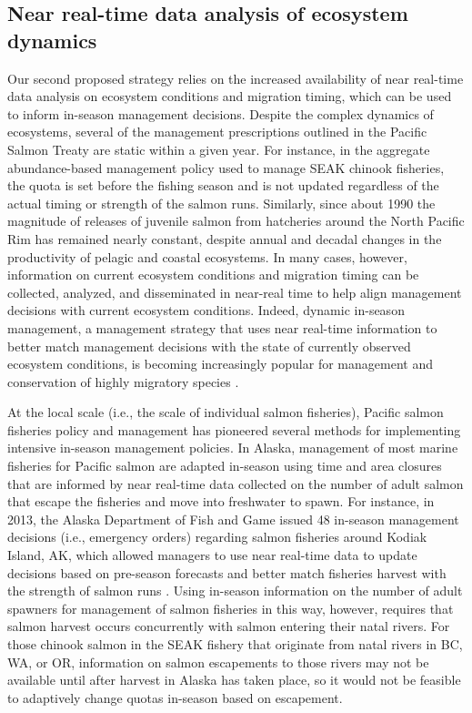 \subsection{Near real-time data analysis of ecosystem dynamics}

Our second proposed strategy relies on the increased availability of near
real-time data analysis on ecosystem conditions and migration timing, which can
be used to inform in-season management decisions. Despite the complex dynamics
of ecosystems, several of the management prescriptions outlined in the Pacific
Salmon Treaty are static within a given year. For instance, in the aggregate
abundance-based management policy used to manage SEAK chinook fisheries, the
quota is set before the fishing season and is not updated regardless of the
actual timing or strength of the salmon runs. Similarly, since about 1990 the
magnitude of releases of juvenile salmon from hatcheries around the North
Pacific Rim has remained nearly constant, despite annual and decadal changes in
the productivity of pelagic and coastal ecosystems. In many cases, however,
information on current ecosystem conditions and migration timing can be
collected, analyzed, and disseminated in near-real time to help align management
decisions with current ecosystem conditions. Indeed, dynamic in-season
management, a management strategy that uses near real-time information to better
match management decisions with the state of currently observed ecosystem
conditions, is becoming increasingly popular for management and conservation of
highly migratory species \citep{Maxwell2015, Lewison2015}.

At the local scale (i.e., the scale of individual salmon fisheries), Pacific
salmon fisheries policy and management has pioneered several methods for
implementing intensive in-season management policies. In Alaska, management of
most marine fisheries for Pacific salmon are adapted in-season using time and
area closures that are informed by near real-time data collected on the number
of adult salmon that escape the fisheries and move into freshwater to spawn. For
instance, in 2013, the Alaska Department of Fish and Game issued 48 in-season
management decisions (i.e., emergency orders) regarding salmon fisheries around
Kodiak Island, AK, which allowed managers to use near real-time data to update
decisions based on pre-season forecasts and better match fisheries harvest with
the strength of salmon runs \citep{Jackson2013}. Using in-season information on
the number of adult spawners for management of salmon fisheries in this way,
however, requires that salmon harvest occurs concurrently with salmon entering
their natal rivers. For those chinook salmon in the SEAK fishery that originate
from natal rivers in BC, WA, or OR, information on salmon escapements to those
rivers may not be available until after harvest in Alaska has taken place, so it
would not be feasible to adaptively change quotas in-season based on escapement.

